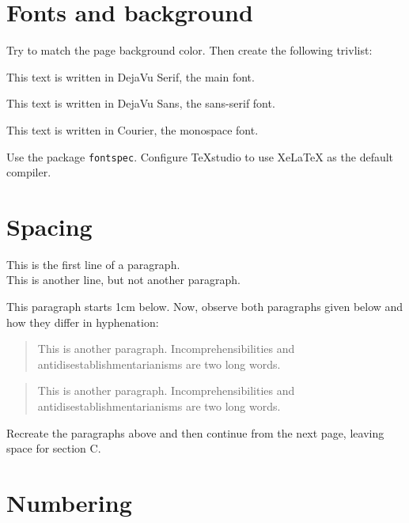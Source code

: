 \documentclass[12pt,a4paper]{article}
\begin{document}
\section{Fonts and background}

Try to match the page background color. Then create the following trivlist:

\begin{trivlist}
    \item This text is written in DejaVu Serif, the main font.

    \item {\sffamily This text is written in DejaVu Sans, the sans-serif font.}

    \item {\ttfamily This text is written in Courier, the monospace font.}
\end{trivlist}

Use the package \texttt{fontspec}. Configure TeXstudio to use XeLaTeX as the default compiler.

\section{Spacing}

This is the first line of a paragraph.\\
This is another line, but not another paragraph.

\vspace{1cm}

This paragraph starts 1cm below. Now, observe both paragraphs given below and how they differ in hyphenation:

\begin{quote}
This is another paragraph. Incomprehensibilities and antidis\-establishmentarianisms are two long words.
\end{quote}

\begin{quote}
This is another paragraph. Incomprehensibilities and \mbox{antidisestablishmentarianisms} are two long words.
\end{quote}

Recreate the paragraphs above and then continue from the next page, leaving space for section C.

\newpage
\vspace*{3cm}

\setcounter{section}{3}
\section{Numbering}
\end{document}

